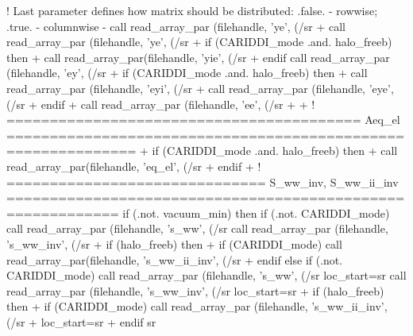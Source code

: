      ! Last parameter defines how matrix should be distributed: .false. - rowwise; .true. - columnwise
-    call read_array_par    (filehandle, 'ye',       (/sr%
+    call read_array_par    (filehandle, 'ye',       (/sr%
+    if (CARIDDI_mode .and. halo_freeb) then
+      call read_array_par(filehandle, 'yie', (/sr%
+    endif
     call read_array_par    (filehandle, 'ey',       (/sr%
+    if (CARIDDI_mode .and. halo_freeb) then
+      call read_array_par  (filehandle, 'eyi',    (/sr%
+      call read_array_par  (filehandle, 'eye',    (/sr%
+    endif
+
     call read_array_par    (filehandle, 'ee',       (/sr%
+    
+    ! =========================================  Aeq_el =============================================================
+    if (CARIDDI_mode .and. halo_freeb) then
+      call read_array_par(filehandle, 'eq_el',  (/sr%
+    endif
+    ! ============================== S_ww_inv, S_ww_ii_inv ===========================================================
     if (.not. vacuum_min) then
       if (.not. CARIDDI_mode) call read_array_par    (filehandle, 's_ww',     (/sr%
       call read_array_par    (filehandle, 's_ww_inv', (/sr%
+      if (halo_freeb) then
+        if (CARIDDI_mode) call read_array_par(filehandle, 's_ww_ii_inv', (/sr%
+      endif
     else
       if (.not. CARIDDI_mode) call read_array_par    (filehandle, 's_ww',     (/sr%
           loc_start=sr%
       call read_array_par    (filehandle, 's_ww_inv', (/sr%
           loc_start=sr%
+      if (halo_freeb) then
+        if (CARIDDI_mode)  call read_array_par    (filehandle, 's_ww_ii_inv', (/sr%
+          loc_start=sr%
+      endif
       sr%
